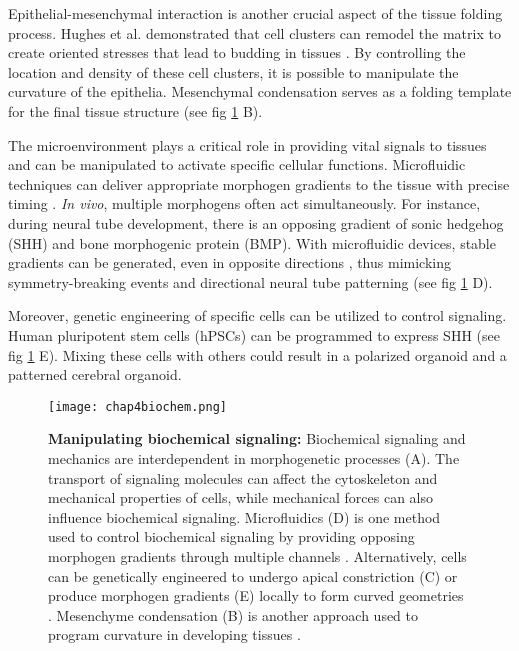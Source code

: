 Epithelial-mesenchymal interaction is another crucial aspect of the tissue folding process. Hughes et al. demonstrated that cell clusters can remodel the matrix to create oriented stresses that lead to budding in tissues \cite{hughes2018}. By controlling the location and density of these cell clusters, it is possible to manipulate the curvature of the epithelia. Mesenchymal condensation serves as a folding template for the final tissue structure \cite{palmquist2022, shyer2017} (see fig \ref{fig_4_3} B).

The microenvironment plays a critical role in providing vital signals to tissues and can be manipulated to activate specific cellular functions. Microfluidic techniques can deliver appropriate morphogen gradients to the tissue with precise timing \cite{hofer2021}. \textit{In vivo}, multiple morphogens often act simultaneously. For instance, during neural tube development, there is an opposing gradient of sonic hedgehog (SHH) and bone morphogenic protein (BMP). With microfluidic devices, stable gradients can be generated, even in opposite directions \cite{demers2016}, thus mimicking symmetry-breaking events and directional neural tube patterning (see fig \ref{fig_4_3} D).

Moreover, genetic engineering of specific cells can be utilized to control signaling. Human pluripotent stem cells (hPSCs) can be programmed to express SHH \cite{cederquist2019} (see fig \ref{fig_4_3} E). Mixing these cells with others could result in a polarized organoid and a patterned cerebral organoid.

\begin{figure}
	\centering
	\texttt{[image: chap4biochem.png]}
	\caption{\label{fig_4_3} \textbf{Manipulating biochemical signaling:} Biochemical signaling and mechanics are interdependent in morphogenetic processes (A). The transport of signaling molecules can affect the cytoskeleton and mechanical properties of cells, while mechanical forces can also influence biochemical signaling. Microfluidics (D) is one method used to control biochemical signaling by providing opposing morphogen gradients through multiple channels \cite{demers2016}. Alternatively, cells can be genetically engineered to undergo apical constriction (C) or produce morphogen gradients (E) locally to form curved geometries \cite{martinez-ara2022, cederquist2019}. Mesenchyme condensation (B) is another approach used to program curvature in developing tissues \cite{hughes2018, palmquist2022}.}
\end{figure}

